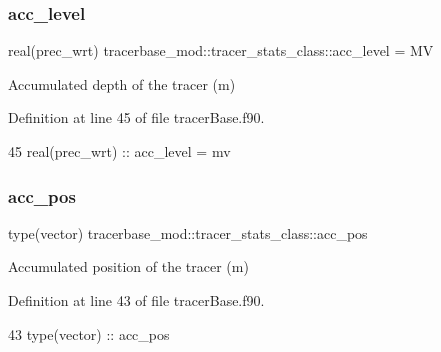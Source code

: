 \subsubsection{\texorpdfstring{acc\+\_\+level}{acc\_level}}
{\footnotesize\ttfamily real(prec\+\_\+wrt) tracerbase\+\_\+mod\+::tracer\+\_\+stats\+\_\+class\+::acc\+\_\+level = MV\hspace{0.3cm}{\ttfamily [private]}}



Accumulated depth of the tracer (m) 



Definition at line 45 of file tracer\+Base.\+f90.


\begin{DoxyCode}
45         \textcolor{keywordtype}{real(prec\_wrt)} :: acc\_level = mv        
\end{DoxyCode}
\mbox{\label{structtracerbase__mod_1_1tracer__stats__class_ab873af2b6de9650bd8db0c4ebbf8bcbe}} 
\subsubsection{\texorpdfstring{acc\+\_\+pos}{acc\_pos}}
{\footnotesize\ttfamily type(vector) tracerbase\+\_\+mod\+::tracer\+\_\+stats\+\_\+class\+::acc\+\_\+pos\hspace{0.3cm}{\ttfamily [private]}}



Accumulated position of the tracer (m) 



Definition at line 43 of file tracer\+Base.\+f90.


\begin{DoxyCode}
43         \textcolor{keywordtype}{type}(vector) :: acc\_pos
\end{DoxyCode}
\mbox{\label{structtracerbase__mod_1_1tracer__stats__class_aaac47a74e7741ce3b8e300f38f1abb0e}} 
